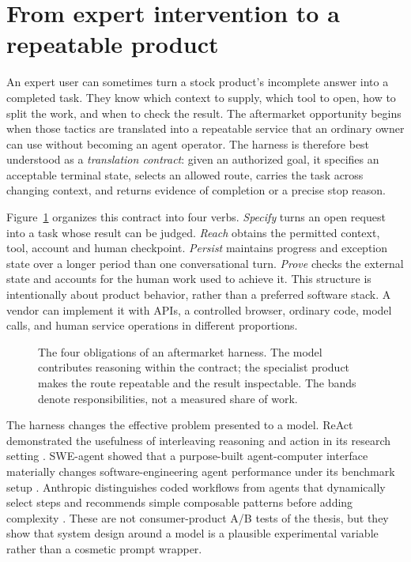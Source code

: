 \section{From expert intervention to a repeatable product}

An expert user can sometimes turn a stock product's incomplete answer into a completed task. They know which context to supply, which tool to open, how to split the work, and when to check the result. The aftermarket opportunity begins when those tactics are translated into a repeatable service that an ordinary owner can use without becoming an agent operator. The harness is therefore best understood as a \emph{translation contract}: given an authorized goal, it specifies an acceptable terminal state, selects an allowed route, carries the task across changing context, and returns evidence of completion or a precise stop reason.

Figure~\ref{fig:contract} organizes this contract into four verbs. \emph{Specify} turns an open request into a task whose result can be judged. \emph{Reach} obtains the permitted context, tool, account and human checkpoint. \emph{Persist} maintains progress and exception state over a longer period than one conversational turn. \emph{Prove} checks the external state and accounts for the human work used to achieve it. This structure is intentionally about product behavior, rather than a preferred software stack. A vendor can implement it with APIs, a controlled browser, ordinary code, model calls, and human service operations in different proportions.

\begin{figure}[tbp]
\centering
\caption{The four obligations of an aftermarket harness. The model contributes reasoning within the contract; the specialist product makes the route repeatable and the result inspectable. The bands denote responsibilities, not a measured share of work.}
\label{fig:contract}
\end{figure}

The harness changes the effective problem presented to a model. ReAct demonstrated the usefulness of interleaving reasoning and action in its research setting \citep{react}. SWE-agent showed that a purpose-built agent-computer interface materially changes software-engineering agent performance under its benchmark setup \citep{sweagent}. Anthropic distinguishes coded workflows from agents that dynamically select steps and recommends simple composable patterns before adding complexity \citep{anthropiceffective}. These are not consumer-product A/B tests of the thesis, but they show that system design around a model is a plausible experimental variable rather than a cosmetic prompt wrapper.

